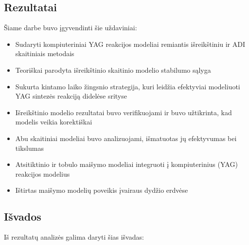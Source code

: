 
\subsection*{Rezultatai}

Šiame darbe buvo įgyvendinti šie uždaviniai:

\begin{itemize}
    \item Sudaryti kompiuteriniai YAG reakcijos modeliai remiantis išreikštiniu ir ADI skaitiniais metodais
    \item Teoriškai parodyta išreikštinio skaitinio modelio stabilumo sąlyga
    \item Sukurta kintamo laiko žingsnio strategija, kuri leidžia efektyviai modeliuoti YAG sintezės reakciją didelėse srityse
    \item Išreikštinio modelio rezultatai buvo verifikuojami ir buvo užtikrinta, kad modelis veikia korektiškai 
    \item Abu skaitiniai modeliai buvo analizuojami, išmatuotas jų efektyvumas bei tikslumas
    \item Atsitiktinio ir tobulo maišymo modeliai integruoti į kompiuterinius (YAG) reakcijos modelius
    \item Ištirtas maišymo modelių poveikis įvairaus dydžio erdvėse 
\end{itemize}

\subsection*{Išvados}

Iš rezultatų analizės galima daryti šias išvadas:

